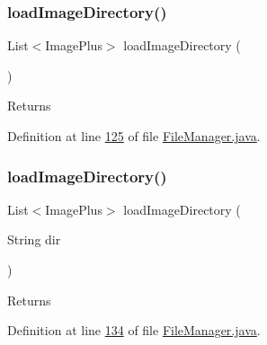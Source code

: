 \hypertarget{classfunctions_1_1_file_manager_a0f8b52da290ba020437d01d4873b1d2c}{}\label{classfunctions_1_1_file_manager_a0f8b52da290ba020437d01d4873b1d2c} 
\subsubsection{\texorpdfstring{load\+Image\+Directory()}{loadImageDirectory()}\hspace{0.1cm}{\footnotesize\ttfamily [1/2]}}
{\footnotesize\ttfamily List$<$Image\+Plus$>$ load\+Image\+Directory (\begin{DoxyParamCaption}{ }\end{DoxyParamCaption})}

\begin{DoxyReturn}{Returns}

\end{DoxyReturn}


Definition at line \hyperlink{_file_manager_8java_source_l00125}{125} of file \hyperlink{_file_manager_8java_source}{File\+Manager.\+java}.

\hypertarget{classfunctions_1_1_file_manager_ae7538dc1fbe0b999be0a86e196de6851}{}\label{classfunctions_1_1_file_manager_ae7538dc1fbe0b999be0a86e196de6851} 
\subsubsection{\texorpdfstring{load\+Image\+Directory()}{loadImageDirectory()}\hspace{0.1cm}{\footnotesize\ttfamily [2/2]}}
{\footnotesize\ttfamily List$<$Image\+Plus$>$ load\+Image\+Directory (\begin{DoxyParamCaption}\item[{String}]{dir }\end{DoxyParamCaption})}

\begin{DoxyReturn}{Returns}

\end{DoxyReturn}


Definition at line \hyperlink{_file_manager_8java_source_l00134}{134} of file \hyperlink{_file_manager_8java_source}{File\+Manager.\+java}.

